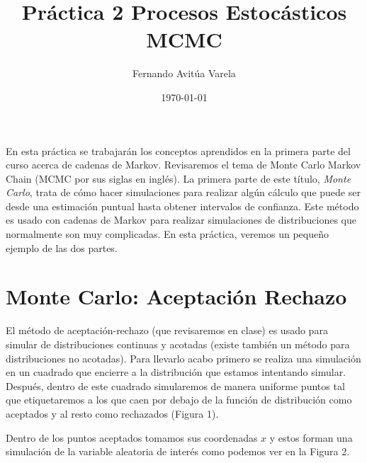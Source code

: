 \documentclass[10pt]{article}
\title{Práctica 2 Procesos Estocásticos MCMC}
\date{\today}
\author{Fernando Avitúa Varela}
\begin{document}
\maketitle

En esta práctica se trabajarán los conceptos aprendidos en la primera parte del curso acerca de cadenas de Markov. Revisaremos el tema de Monte Carlo Markov Chain (MCMC por sus siglas en inglés). La primera parte de este título, \emph{Monte Carlo}, trata de  cómo hacer simulaciones para realizar algún cálculo que puede ser desde una estimación puntual hasta obtener intervalos de confianza. Este método es usado con cadenas de Markov para realizar simulaciones de distribuciones que normalmente son muy complicadas. En esta práctica, veremos un pequeño ejemplo de las dos partes.

\section*{Monte Carlo: Aceptación Rechazo}

El método de aceptación-rechazo (que revisaremos en clase) es usado para simular de distribuciones continuas y acotadas (existe también un método para distribuciones no acotadas). Para llevarlo acabo primero se realiza una simulación en un cuadrado que encierre a la distribución que estamos intentando simular. Después, dentro de este cuadrado simularemos de manera uniforme puntos tal que etiquetaremos a los que caen por debajo de la función de distribución como aceptados y al resto como rechazados (Figura 1).


Dentro de los puntos aceptados tomamos sus coordenadas $x$ y estos forman una simulación de la variable aleatoria de interés como podemos ver en la Figura 2.
\end{document}
